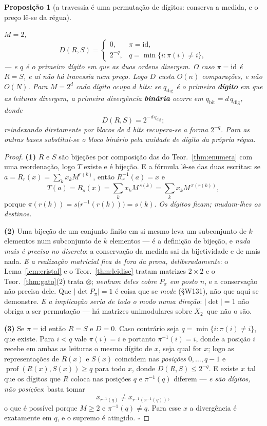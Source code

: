 \documentclass[11pt,a4paper]{article}
\newcommand{\Zc}{\ensuremath{X_2}}
\newtheorem{proposicao}[teorema]{Proposição}
\begin{document}
\begin{proposicao}[a travessia é uma permutação de dígitos: conserva a medida, e o preço lê-se da régua]
\begin{enumerate}
  $M=2$,
  \[
   \boxed{\;D(R,S)=\begin{cases}0,&\pi=\mathrm{id},\\[2pt]
                                2^{-q},&q=\min\{i:\pi(i)\neq i\},\end{cases}\;}
  \]
  --- e $q$ é o primeiro dígito em que as duas ordens divergem. \emph{O caso
  $\pi=\mathrm{id}$ é $R=S$}, e aí não há travessia nem preço. Logo $D$ custa $O(n)$
  comparações, e não $O(N)$. \emph{Para $M=2^{d}$ cada dígito ocupa $d$ bits}: se $q_{\mathrm{dig}}$ é o primeiro
\textbf{dígito} em que as leituras divergem, a primeira divergência \textbf{binária}
ocorre em $q_{\mathrm{bit}}=d\,q_{\mathrm{dig}}$, donde
\[
 D(R,S)=2^{-d\,q_{\mathrm{dig}}};
\]
reindexando diretamente por blocos de $d$ bits recupera-se a forma $2^{-q}$. Para as
outras bases substitui-se o bloco binário pela unidade de dígito da própria régua.
\end{enumerate}
\end{proposicao}

\begin{proof}
\textbf{(1)} $R$ e $S$ são bijeções por composição das do Teor.~\ref{thm:enumera} com
uma reordenação, logo $T$ existe e é bijeção. E a fórmula lê-se das duas escritas: se
$a=R_r(x)=\sum_k x_k M^{r(k)}$, então $R_r^{-1}(a)=x$ e
\[
 T(a)=R_s(x)=\sum_k x_k M^{\,s(k)}=\sum_k x_k M^{\,\pi(r(k))},
\]
porque $\pi(r(k))=s\bigl(r^{-1}(r(k))\bigr)=s(k)$. \emph{Os dígitos ficam; mudam-lhes os
destinos.}

\textbf{(2)} Uma bijeção de um conjunto finito em si mesmo leva um subconjunto de $k$
elementos num subconjunto de $k$ elementos --- é a definição de bijeção, e \emph{nada
mais é preciso no discreto}: a conservação da medida sai da bijetividade e de mais nada.
\emph{E a realização matricial fica de fora da prova, deliberadamente}: o
Lema~\ref{lem:cristal} e o Teor.~\ref{thm:leidisc} tratam matrizes $2\times2$ e o
Teor.~\ref{thm:gato}(2) trata $\otimes$; \emph{nenhum deles cobre $P_{\pi}$ em posto
$n$}, e a conservação não precisa dele. Que $\lvert\det P_{\pi}\rvert=1$ é coisa que se
\emph{mede} (§W131), não que aqui se demonstre. \emph{E a implicação seria de todo o
modo numa direção}: $\lvert\det\rvert=1$ não obriga a ser permutação --- há matrizes
unimodulares sobre \Zc\ que não o são.

\textbf{(3)} Se $\pi=\mathrm{id}$ então $R=S$ e $D=0$. Caso contrário seja
$q=\min\{i:\pi(i)\neq i\}$, que existe. Para $i<q$ vale $\pi(i)=i$ e portanto
$\pi^{-1}(i)=i$, donde a posição $i$ recebe em ambas as leituras o mesmo dígito de $x$,
seja qual for $x$; logo as representações de $R(x)$ e $S(x)$
coincidem nas \emph{posições} $0,\dots,q-1$ e $\operatorname{prof}(R(x),S(x))\ge q$ para todo
$x$, donde $D(R,S)\le2^{-q}$. E existe $x$ tal que os dígitos que $R$ coloca nas posições $q$ e $\pi^{-1}(q)$
diferem --- \emph{e são dígitos, não posições}: basta tomar
\[
 x_{r^{-1}(q)}\neq x_{r^{-1}(\pi^{-1}(q))},
\]
o que é possível porque $M\ge2$ e $\pi^{-1}(q)\neq q$. Para esse
$x$ a divergência é exatamente em $q$, e o supremo é atingido. $\square$
\end{proof}
\end{document}
